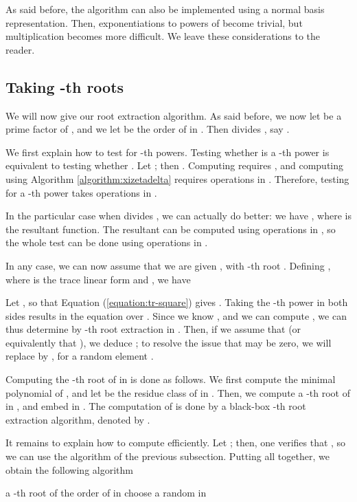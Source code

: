 \documentclass[12pt]{article}
\theoremstyle{plain}
\theoremstyle{definition}
\newcommand{\refequation}[1]{Equation (\ref{#1})}
\newcommand{\refalgorithm}[1]{Algorithm \ref{#1}}
\newcounter{algorithm}
\begin{document}
As said before, the algorithm can also be implemented using a normal
basis representation. Then, exponentiations to powers of  become
trivial, but multiplication becomes more difficult. We leave these
considerations to the reader.



\subsection{Taking -th roots} 

We will now give our root extraction algorithm. As said before, we now
let  be a prime factor of , and we let  be the order of 
in . Then  divides , say .

We first explain how to test for -th powers. Testing whether  is a -th power is equivalent to testing whether
. Let ; then . Computing 
requires , and computing  using \refalgorithm{algorithm:xizetadelta}
requires  operations in
. Therefore, testing for a -th power takes  operations in .

In the particular case when  divides , we can actually do
better: we have , where  is the resultant
function. The resultant can be computed using 
operations in , so the whole test can be done using
 operations in .

In any case, we can now assume that we are given ,
with -th root . 
Defining , where
 is the trace linear form and
, we have

Let , so that
\refequation{equation:tr-square} gives .  Taking the
-th power in both sides results in the equation 
over . Since we know , and we can compute , we can thus
determine  by -th root extraction in . Then, if we
assume that  (or equivalently that ), we deduce
; to resolve the issue that  may be
zero, we will replace  by , for a random element .

Computing the -th root of  in  is done as follows.
We first compute the minimal polynomial  of , and
let  be the residue class of  in .
Then, we compute a -th root  of  in , and
embed  in . The computation of  is done by a black-box
-th root extraction algorithm, denoted by .

It remains to explain how to compute  efficiently. Let ; then, one verifies that , so we can use the algorithm of the
previous subsection. Putting all together, we obtain the following
algorithm

\begin{algorithm}
[-th root in ]
\label{algorithm:new}
\begin{algorithmic}[1]
\REQUIRE 
\ENSURE a -th root of 
\STATE  the order of  in 
\STATE 
\REPEAT
\STATE choose a random 
\STATE 
\STATE 
\STATE 
\UNTIL {}
\STATE 
\STATE  in 
\RETURN 
\end{algorithmic}
\end{algorithm}
\end{document}
